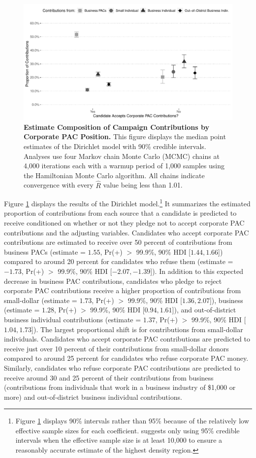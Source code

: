\documentclass[12pt]{article}
\begin{document}
\begin{figure}[!htb]
    \centering
    \includegraphics[width=0.9\linewidth]{dir_model_results.pdf}
    \caption{\textbf{Estimate Composition of Campaign Contributions by Corporate PAC Position.} This figure displays the median point estimates of the Dirichlet model with 90\% credible intervals. Analyses use four Markov chain Monte Carlo (MCMC) chains at 4,000 iterations each with a warmup period of 1,000 samples using the Hamiltonian Monte Carlo algorithm. All chains indicate convergence with every $\hat{R}$ value being less than 1.01.}
    \label{fig: dir results}
\end{figure}

Figure \ref{fig: dir results} displays the results of the Dirichlet model.\footnote{Figure \ref{fig: dir results} displays 90\% intervals rather than 95\% because of the relatively low effective sample sizes for each coefficient. \citet{kruschke2014} suggests only using 95\% credible intervals when the effective sample size is at least 10,000 to ensure a reasonably accurate estimate of the highest density region.} It summarizes the estimated proportion of contributions from each source that a candidate is predicted to receive conditioned on whether or not they pledge not to accept corporate PAC contributions and the adjusting variables. Candidates who accept corporate PAC contributions are estimated to receive over 50 percent of contributions from business PACs (estimate = $1.55$, Pr(+) $>$ 99.9\%, 90\% HDI [$1.44, 1.66$]) compared to around 20 percent for candidates who refuse them (estimate = $-1.73$, Pr(+) $>$ 99.9\%, 90\% HDI [$-2.07, -1.39$]). In addition to this expected decrease in business PAC contributions, candidates who pledge to reject corporate PAC contributions receive a higher proportion of contributions from small-dollar (estimate = $1.73$, Pr(+) $>$ 99.9\%, 90\% HDI [$1.36, 2.07$]), business (estimate = $1.28$, Pr(+) $>$ 99.9\%, 90\% HDI [$0.94, 1.61$]), and out-of-district business individual contributions (estimate = $1.37$, Pr(+) $>$ 99.9\%, 90\% HDI [$1.04, 1.73$]). The largest proportional shift is for contributions from small-dollar individuals. Candidates who accept corporate PAC contributions are predicted to receive just over 10 percent of their contributions from small-dollar donors compared to around 25 percent for candidates who refuse corporate PAC money. Similarly, candidates who refuse corporate PAC contributions are predicted to receive around 30 and 25 percent of their contributions from business (contributions from individuals that work in a business industry of \$1,000 or more) and out-of-district business individual contributions. 
\end{document}
